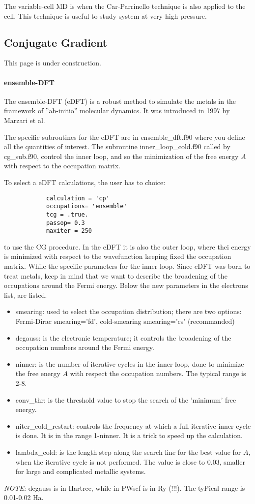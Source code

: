 \documentclass[12pt,a4paper]{article}
\begin{document}
The variable-cell MD is when the Car-Parrinello technique is also applied 
to the cell. This technique is useful to study system at very high pressure.

\subsection{ Conjugate Gradient }

This page is under construction.

\paragraph{ ensemble-DFT }

The ensemble-DFT (eDFT) is a robust method to simulate the metals in the 
framework of ''ab-initio'' molecular dynamics. It was introduced in 1997 
by Marzari et al.

The specific subroutines for the eDFT are in ensemble\_dft.f90 where you 
define all the quantities of interest. The subroutine inner\_loop\_cold.f90
called by cg\_sub.f90, control the inner loop, and so the minimization of 
the free energy $A$ with respect to the occupation matrix.

To select a eDFT calculations, the user has to choice:
\begin{verbatim}
            calculation = 'cp'
            occupations= 'ensemble' 
            tcg = .true.
            passop= 0.3
            maxiter = 250
\end{verbatim}
to use the CG procedure. In the eDFT it is also the outer loop, where thei
energy is minimized with respect to the wavefunction keeping fixed the 
occupation matrix. While the specific parameters for the inner loop.
Since eDFT was born to treat metals, keep in mind that we want to describe 
the broadening of the occupations around the Fermi energy.
Below the new parameters in the electrons list, are listed.
\begin{itemize}
\item smearing: used to select the occupation distribution;
there are two options: Fermi-Dirac smearing='fd', cold-smearing
smearing='cs' (recommanded) 
\item degauss: is the electronic temperature; it controls the broadening
of the occupation numbers around the Fermi energy. 
\item ninner: is the number of iterative cycles in the inner loop, 
done to minimize the free energy $A$ with respect the occupation numbers.
The typical range is 2-8.
\item conv\_thr: is the threshold value to stop the search of the 'minimum' 
free energy.
\item niter\_cold\_restart: controls the frequency at which a full iterative
inner cycle is done. It is in the range 1-ninner. It is a trick to speed up 
the calculation.
\item lambda\_cold: is the length step along the search line for the best 
value for $A$, when the iterative cycle is not performed. The value is close 
to 0.03, smaller for large and complicated metallic systems.
\end{itemize}
{\em NOTE:} degauss is in Hartree, while in PWscf is in Ry (!!!). 
The tyPical range is 0.01-0.02 Ha.
\end{document}
